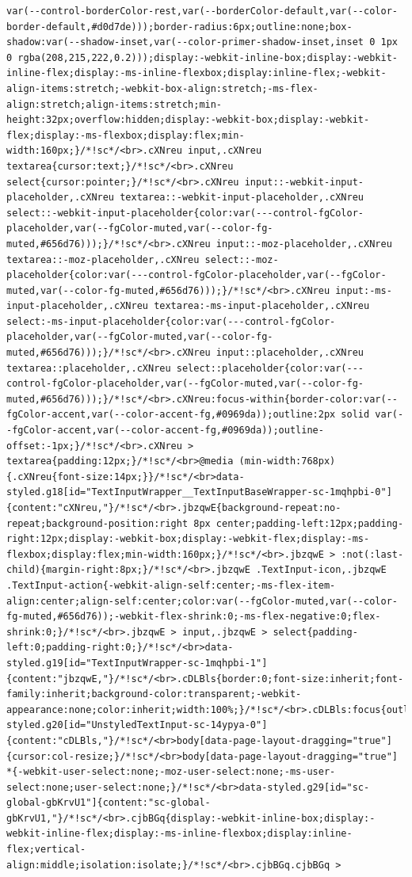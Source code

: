 \documentclass[
  letterpaper,
]{book}
\begin{document}
\begin{verbatim}
var(--control-borderColor-rest,var(--borderColor-default,var(--color-border-default,#d0d7de)));border-radius:6px;outline:none;box-shadow:var(--shadow-inset,var(--color-primer-shadow-inset,inset 0 1px 0 rgba(208,215,222,0.2)));display:-webkit-inline-box;display:-webkit-inline-flex;display:-ms-inline-flexbox;display:inline-flex;-webkit-align-items:stretch;-webkit-box-align:stretch;-ms-flex-align:stretch;align-items:stretch;min-height:32px;overflow:hidden;display:-webkit-box;display:-webkit-flex;display:-ms-flexbox;display:flex;min-width:160px;}/*!sc*/<br>.cXNreu input,.cXNreu textarea{cursor:text;}/*!sc*/<br>.cXNreu select{cursor:pointer;}/*!sc*/<br>.cXNreu input::-webkit-input-placeholder,.cXNreu textarea::-webkit-input-placeholder,.cXNreu select::-webkit-input-placeholder{color:var(---control-fgColor-placeholder,var(--fgColor-muted,var(--color-fg-muted,#656d76)));}/*!sc*/<br>.cXNreu input::-moz-placeholder,.cXNreu textarea::-moz-placeholder,.cXNreu select::-moz-placeholder{color:var(---control-fgColor-placeholder,var(--fgColor-muted,var(--color-fg-muted,#656d76)));}/*!sc*/<br>.cXNreu input:-ms-input-placeholder,.cXNreu textarea:-ms-input-placeholder,.cXNreu select:-ms-input-placeholder{color:var(---control-fgColor-placeholder,var(--fgColor-muted,var(--color-fg-muted,#656d76)));}/*!sc*/<br>.cXNreu input::placeholder,.cXNreu textarea::placeholder,.cXNreu select::placeholder{color:var(---control-fgColor-placeholder,var(--fgColor-muted,var(--color-fg-muted,#656d76)));}/*!sc*/<br>.cXNreu:focus-within{border-color:var(--fgColor-accent,var(--color-accent-fg,#0969da));outline:2px solid var(--fgColor-accent,var(--color-accent-fg,#0969da));outline-offset:-1px;}/*!sc*/<br>.cXNreu > textarea{padding:12px;}/*!sc*/<br>@media (min-width:768px){.cXNreu{font-size:14px;}}/*!sc*/<br>data-styled.g18[id="TextInputWrapper__TextInputBaseWrapper-sc-1mqhpbi-0"]{content:"cXNreu,"}/*!sc*/<br>.jbzqwE{background-repeat:no-repeat;background-position:right 8px center;padding-left:12px;padding-right:12px;display:-webkit-box;display:-webkit-flex;display:-ms-flexbox;display:flex;min-width:160px;}/*!sc*/<br>.jbzqwE > :not(:last-child){margin-right:8px;}/*!sc*/<br>.jbzqwE .TextInput-icon,.jbzqwE .TextInput-action{-webkit-align-self:center;-ms-flex-item-align:center;align-self:center;color:var(--fgColor-muted,var(--color-fg-muted,#656d76));-webkit-flex-shrink:0;-ms-flex-negative:0;flex-shrink:0;}/*!sc*/<br>.jbzqwE > input,.jbzqwE > select{padding-left:0;padding-right:0;}/*!sc*/<br>data-styled.g19[id="TextInputWrapper-sc-1mqhpbi-1"]{content:"jbzqwE,"}/*!sc*/<br>.cDLBls{border:0;font-size:inherit;font-family:inherit;background-color:transparent;-webkit-appearance:none;color:inherit;width:100%;}/*!sc*/<br>.cDLBls:focus{outline:0;}/*!sc*/<br>data-styled.g20[id="UnstyledTextInput-sc-14ypya-0"]{content:"cDLBls,"}/*!sc*/<br>body[data-page-layout-dragging="true"]{cursor:col-resize;}/*!sc*/<br>body[data-page-layout-dragging="true"] *{-webkit-user-select:none;-moz-user-select:none;-ms-user-select:none;user-select:none;}/*!sc*/<br>data-styled.g29[id="sc-global-gbKrvU1"]{content:"sc-global-gbKrvU1,"}/*!sc*/<br>.cjbBGq{display:-webkit-inline-box;display:-webkit-inline-flex;display:-ms-inline-flexbox;display:inline-flex;vertical-align:middle;isolation:isolate;}/*!sc*/<br>.cjbBGq.cjbBGq > 
\end{verbatim}
\end{document}
